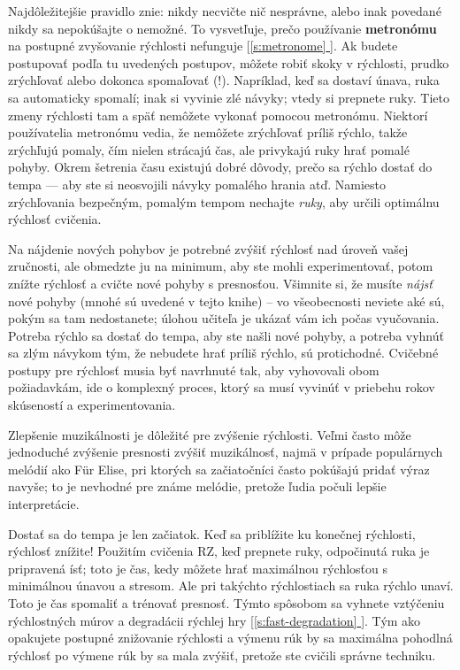 \documentclass[11pt,a4paper]{book}
\newcommand*{\fullref}[1]{\hyperref[{#1}]{\ref*{#1} \nameref*{#1}}} %
\newcommand*{\fullrefp}[1]{[\fullref{#1}]} %
\begin{document}
Najdôležitejšie pravidlo znie: nikdy necvičte nič nesprávne, alebo inak povedané nikdy sa nepokúšajte o nemožné. To vysvetľuje, prečo používanie \textbf{metronómu} na postupné zvyšovanie rýchlosti nefunguje \fullrefp{s:metronome}. Ak budete postupovať podľa tu uvedených postupov, môžete robiť skoky v rýchlosti, prudko zrýchľovať alebo dokonca spomaľovať (!). Napríklad, keď sa dostaví únava, ruka sa automaticky spomalí; inak si vyvinie zlé návyky; vtedy si prepnete ruky. Tieto zmeny rýchlosti tam a späť nemôžete vykonať pomocou metronómu. Niektorí používatelia metronómu vedia, že nemôžete zrýchľovať príliš rýchlo, takže zrýchľujú pomaly, čím nielen strácajú čas, ale privykajú ruky hrať pomalé pohyby. Okrem šetrenia času existujú dobré dôvody, prečo sa rýchlo dostať do tempa — aby ste si neosvojili návyky pomalého hrania atď. Namiesto zrýchľovania bezpečným, pomalým tempom nechajte \emph{ruky}, aby určili optimálnu rýchlosť cvičenia.
    
Na nájdenie nových pohybov je potrebné zvýšiť rýchlosť nad úroveň vašej zručnosti, ale obmedzte ju na minimum, aby ste mohli experimentovať, potom znížte rýchlosť a cvičte nové pohyby s presnosťou. Všimnite si, že musíte \emph{nájsť} nové pohyby (mnohé sú uvedené v tejto knihe) – vo všeobecnosti neviete aké sú, pokým sa tam nedostanete; úlohou učiteľa je ukázať vám ich počas vyučovania. Potreba rýchlo sa dostať do tempa, aby ste našli nové pohyby, a potreba vyhnúť sa zlým návykom tým, že nebudete hrať príliš rýchlo, sú protichodné. Cvičebné postupy pre rýchlosť musia byť navrhnuté tak, aby vyhovovali obom požiadavkám, ide o komplexný proces, ktorý sa musí vyvinúť v priebehu rokov skúseností a experimentovania.

Zlepšenie muzikálnosti je dôležité pre zvýšenie rýchlosti. Veľmi často môže jednoduché zvýšenie presnosti zvýšiť muzikálnosť, najmä v prípade populárnych melódií ako Für Elise, pri ktorých sa začiatočníci často pokúšajú pridať výraz navyše; to je nevhodné pre známe melódie, pretože ľudia počuli lepšie interpretácie.

Dostať sa do tempa je len začiatok. Keď sa priblížite ku konečnej rýchlosti, rýchlosť znížite! Použitím cvičenia RZ, keď prepnete ruky, odpočinutá ruka je pripravená ísť; toto je čas, kedy môžete hrať maximálnou rýchlosťou s minimálnou únavou a stresom. Ale pri takýchto rýchlostiach sa ruka rýchlo unaví. Toto je čas spomaliť a trénovať presnosť. Týmto spôsobom sa vyhnete vztýčeniu rýchlostných múrov a degradácii rýchlej hry \fullrefp{s:fast-degradation}. Tým ako opakujete postupné znižovanie rýchlosti a výmenu rúk by sa maximálna pohodlná rýchlosť po výmene rúk by sa mala zvýšiť, pretože ste cvičili správne techniku.
\end{document}
